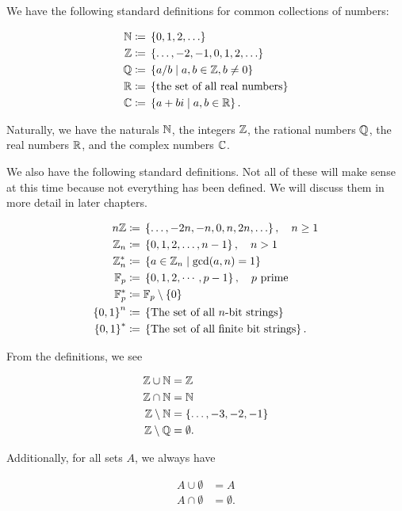 We have the following standard definitions for common collections
of numbers:

\begin{align}
    \mathbb{N} &\coloneqq{} \left\{ 0, 1, 2, \ldots \right\} \nonumber\\
    \mathbb{Z} &\coloneqq{} \left\{ \ldots, -2, -1, 0, 1, 2, \ldots \right\} \nonumber\\
    \mathbb{Q} &\coloneqq{} \left\{ a/b \mid a,b\in\mathbb{Z}, b\ne0 \right\} \nonumber\\
    \mathbb{R} &\coloneqq{} \left\{ \text{the set of all real numbers} \right\} \nonumber\\
    \mathbb{C} &\coloneqq{} \left\{ a + bi \mid a,b\in\mathbb{R} \right\}.
\end{align}

\noindent
Naturally, we have the naturals $\mathbb{N}$, the integers $\mathbb{Z}$,
the rational numbers $\mathbb{Q}$, the real numbers $\mathbb{R}$,
and the complex numbers $\mathbb{C}$.

We also have the following standard definitions.
Not all of these will make sense at this time because
not everything has been defined.
We will discuss them in more detail in later chapters.

\begin{align}
    n\mathbb{Z} &\coloneqq{} \left\{ \ldots, -2n, -n, 0, n, 2n, \ldots \right\}, \quad n\ge1
        \nonumber\\
    \mathbb{Z}_{n} &\coloneqq{} \left\{ 0, 1, 2, \ldots, n-1 \right\}, \quad n>1\nonumber\\
    \mathbb{Z}_{n}^{*} &\coloneqq{} \left\{ a\in\mathbb{Z}_{n}\mid \gcd(a,n)=1 \right\}
        \nonumber\\
    \mathbb{F}_{p} &\coloneqq{} \left\{ 0, 1, 2, \cdots, p-1 \right\}, \quad \text{$p$ prime}
        \nonumber\\
    \mathbb{F}_{p}^{*} &\coloneqq{} \mathbb{F}_{p}\setminus\left\{ 0 \right\} \nonumber\\
    \left\{ 0,1 \right\}^{n} &\coloneqq{} \left\{ \text{The set of all $n$-bit strings} \right\}
        \nonumber\\
    \left\{ 0,1 \right\}^{*} &\coloneqq{}
        \left\{ \text{The set of all finite bit strings} \right\}.
\end{align}

\begin{example}
From the definitions, we see

\begin{align}
    \mathbb{Z} \cup \mathbb{N} &= \mathbb{Z} \nonumber\\
    \mathbb{Z} \cap \mathbb{N} &= \mathbb{N} \nonumber\\
    \mathbb{Z} \setminus \mathbb{N} &= \left\{ \ldots, -3, -2, -1 \right\} \nonumber\\
    \mathbb{Z} \setminus \mathbb{Q} &= \emptyset.
\end{align}

\noindent
Additionally, for all sets $A$, we always have

\begin{align}
    A \cup \emptyset &= A \nonumber\\
    A \cap \emptyset &= \emptyset.
\end{align}
\end{example}

